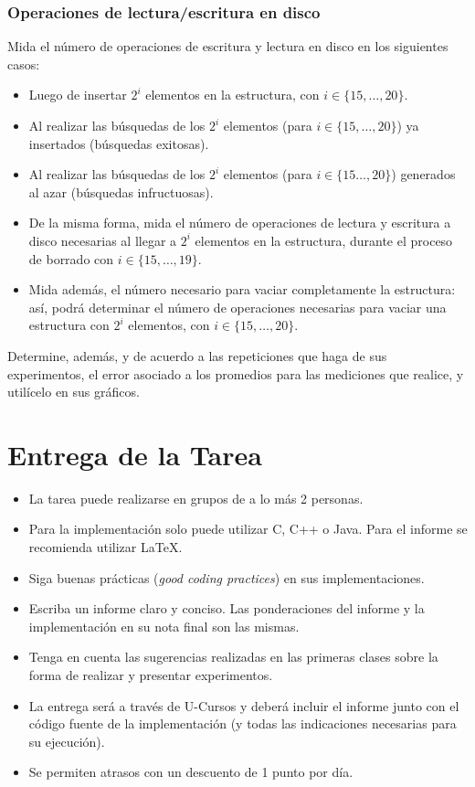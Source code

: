 \documentclass[dcc,uchile]{fcfmcourse}
\begin{document}
\subsubsection*{Operaciones de lectura/escritura en disco}
Mida el número de operaciones de escritura y lectura en disco en los siguientes casos:
\begin{itemize}
    \item Luego de insertar $2^i$ elementos en la estructura, con $i\in \{15,\ldots,20\}$.
    \item Al realizar las búsquedas de los $2^i$ elementos (para $i \in \{15,\ldots,20\}$) ya insertados (búsquedas exitosas).
    \item Al realizar las búsquedas de los $2^i$ elementos (para $i\in\{15\ldots, 20\}$) generados al azar (búsquedas infructuosas).
    \item De la misma forma, mida el número de operaciones de lectura y escritura a disco necesarias al llegar a $2^i$ elementos en la estructura, durante el proceso de borrado con $i\in\{15,\ldots,19\}$.
    \item Mida además, el número necesario para vaciar completamente la estructura: así, podrá determinar el número de operaciones necesarias para vaciar una estructura con $2^i$ elementos, con $i\in\{15,\ldots, 20\}$.
\end{itemize}
Determine, además, y de acuerdo a las repeticiones que haga de sus experimentos, el error asociado a los promedios para las mediciones que realice, y utilícelo en sus gráficos.

\section{Entrega de la Tarea}
\begin{itemize}
    \item La tarea puede realizarse en grupos de a lo más 2 personas.
    \item Para la implementación solo puede utilizar C, C++ o Java. Para el informe se recomienda utilizar \LaTeX .
    \item Siga buenas prácticas (\textit{good coding practices}) en sus implementaciones.
    \item Escriba un informe claro y conciso. Las ponderaciones del informe y la implementación en su nota final son las mismas.
    \item Tenga en cuenta las sugerencias realizadas en las primeras clases sobre la forma de realizar y presentar experimentos.
    \item La entrega será a través de U-Cursos y deberá incluir el informe junto con el código fuente de la implementación (y todas las indicaciones necesarias para su ejecución).
    \item Se permiten atrasos con un descuento de 1 punto por día.
\end{itemize}
\end{document}
